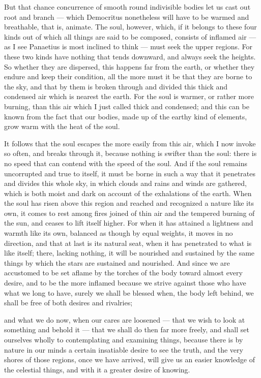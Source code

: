  But that chance concurrence of smooth round indivisible bodies let us cast out root and branch — which Democritus nonetheless will have to be warmed and breathable, that is, animate. The soul, however, which, if it belongs to these four kinds out of which all things are said to be composed, consists of inflamed air — as I see Panaetius is most inclined to think — must seek the upper regions. For these two kinds have nothing that tends downward, and always seek the heights. So whether they are dispersed, this happens far from the earth, or whether they endure and keep their condition, all the more must it be that they are borne to the sky, and that by them is broken through and divided this thick and condensed air which is nearest the earth. For the soul is warmer, or rather more burning, than this air which I just called thick and condensed; and this can be known from the fact that our bodies, made up of the earthy kind of elements, grow warm with the heat of the soul.

 It follows that the soul escapes the more easily from this air, which I now invoke so often, and breaks through it, because nothing is swifter than the soul: there is no speed that can contend with the speed of the soul. And if the soul remains uncorrupted and true to itself, it must be borne in such a way that it penetrates and divides this whole sky, in which clouds and rains and winds are gathered, which is both moist and dark on account of the exhalations of the earth. When the soul has risen above this region and reached and recognized a nature like its own, it comes to rest among fires joined of thin air and the tempered burning of the sun, and ceases to lift itself higher. For when it has attained a lightness and warmth like its own, balanced as though by equal weights, it moves in no direction, and that at last is its natural seat, when it has penetrated to what is like itself; there, lacking nothing, it will be nourished and sustained by the same things by which the stars are sustained and nourished. And since we are accustomed to be set aflame by the torches of the body toward almost every desire, and to be the more inflamed because we strive against those who have what we long to have, surely we shall be blessed when, the body left behind, we shall be free of both desires and rivalries;

 and what we do now, when our cares are loosened — that we wish to look at something and behold it — that we shall do then far more freely, and shall set ourselves wholly to contemplating and examining things, because there is by nature in our minds a certain insatiable desire to see the truth, and the very shores of those regions, once we have arrived, will give us an easier knowledge of the celestial things, and with it a greater desire of knowing.

